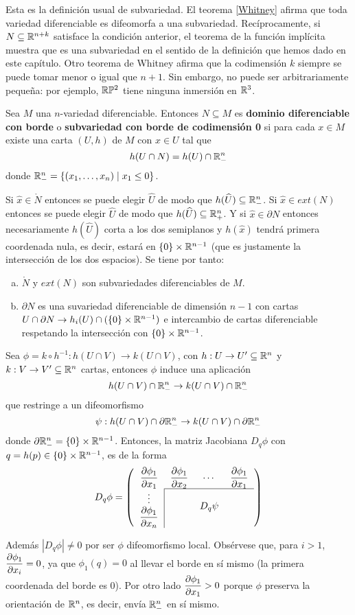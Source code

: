 \documentclass[CV.tex]{subfiles}
\begin{document}
Esta es la definición usual de subvariedad. El teorema \ref{Whitney} afirma que toda variedad diferenciable es difeomorfa a una subvariedad. Recíprocamente, si $N\subseteq\mathbb{R}^{n+k}$ satisface la condición anterior, el teorema de la función implícita muestra que es una subvariedad en el sentido de la definición que hemos dado en este capítulo. Otro teorema de Whitney afirma que la codimensión $k$ siempre se puede tomar menor o igual que $n+1$. Sin embargo, no puede ser arbitrariamente pequeña: por ejemplo, $\mathbb{R}\mathbb{P}^2$ tiene ninguna inmersión en $\mathbb{R}^3$. 

\begin{defi}
Sea $M$ una $n$-variedad diferenciable. Entonces $N\subseteq M$ es \textbf{dominio diferenciable con borde} o \textbf{subvariedad con borde de codimensión 0} si para cada $x\in M$ existe una carta $(U,h)$ de $M$ con $x\in U$ tal que 
\[
h(U\cap N)=h(U)\cap\mathbb{R}^n_-
\]
donde $\mathbb{R}^n_-=\{(x_1,\dots, x_n)\mid x_1\leq 0\}$. 
\end{defi}

Si $\hat{x}\in \mathring{N}$ entonces se puede elegir $\widehat{U}$ de modo que $h(\widehat{U})\subseteq\mathbb{R}^n_-$. Si $\hat{x}\in ext(N)$ entonces se puede elegir $\widehat{U}$ de modo que $h(\widehat{U})\subseteq\mathbb{R}^n_+$. Y si $\hat{x}\in\partial N$ entonces necesariamente $h(\widehat{U})$ corta a los dos semiplanos y $h(\hat{x})$ tendrá primera coordenada nula, es decir, estará en $\{0\}\times \mathbb{R}^{n-1}$ (que es justamente la intersección de los dos espacios). Se tiene por tanto:
\begin{enumerate}[a)]
\item $\mathring{N}$ y $ext(N)$ son subvariedades diferenciables de $M$.
\item $\partial N$ es una suvariedad diferenciable de dimensión $n-1$ con cartas $U\cap \partial N\to h_i(U)\cap (\{0\}\times\mathbb{R}^{n-1})$ e intercambio de cartas diferenciable respetando la intersección con $\{0\}\times\mathbb{R}^{n-1}$. 
\end{enumerate}
Sea $\phi=k\circ h^{-1}:h(U\cap V)\to k(U\cap V)$, con $h:U\to U'\subseteq\mathbb{R}^n$ y $k:V\to V'\subseteq\mathbb{R}^n$ cartas, entonces $\phi$ induce una aplicación 
\[
h(U\cap V)\cap\mathbb{R}^n_-\to k(U\cap V)\cap\mathbb{R}^n_-
\]
que restringe a un difeomorfismo
\[
\psi:h(U\cap V)\cap\partial\mathbb{R}^n_-\to k(U\cap V)\cap\partial\mathbb{R}^n_-
\]
donde $\partial\mathbb{R}^n_-=\{0\}\times\mathbb{R}^{n-1}$. Entonces, la matriz Jacobiana $D_q\phi$ con $q=h(p)\in\{0\}\times\mathbb{R}^{n-1}$, es de la forma
\[
D_q\phi=\left(
\begin{tabular}{cccc}
$\dparcial{\phi_1}{x_1}$ & $\dparcial{\phi_1}{x_2}$ & $\cdots$ & $\dparcial{\phi_1}{x_1}$\\\cline{2-4}
\multicolumn{1}{c|}{$\vdots$}  & &\multirow{2}{*}{$D_q\psi$} & \\
\multicolumn{1}{c|}{$\dparcial{\phi_1}{x_n}$} & & & 
\end{tabular}
 \right)
\]

Además $|D_q\phi|\neq 0$ por ser $\phi$ difeomorfismo local. Obsérvese que, para $i>1$, $\dfrac{\partial \phi_1}{\partial x_i}=0$, ya que $\phi_1(q)=0$ al llevar el borde en sí mismo (la primera coordenada del borde es 0). Por otro lado  $\dfrac{\partial \phi_1}{\partial x_1}>0$ porque $\phi$ preserva la orientación de $\mathbb{R}^n$, es decir, envía $\mathbb{R}^n_-$ en sí mismo. 
\end{document}
